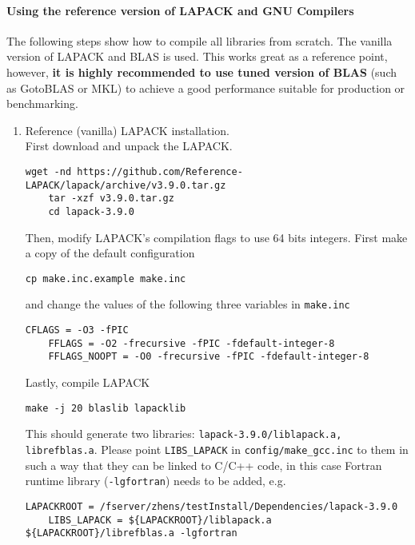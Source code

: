 \documentclass[english,11pt]{article}
\begin{document}
\paragraph{Using the reference version of LAPACK and GNU Compilers}
The following steps show how to compile all libraries from scratch. The vanilla version of LAPACK and BLAS is used. This works great as a reference point, however, {\bf it is  highly recommended to use tuned version of BLAS} (such as GotoBLAS or MKL) to achieve a good performance suitable for production or benchmarking.
\begin{enumerate}
    \item Reference (vanilla) LAPACK installation.\\
    First download and unpack the LAPACK.
    \begin{lstlisting}[breaklines=true, showstringspaces=false]
    wget -nd https://github.com/Reference-LAPACK/lapack/archive/v3.9.0.tar.gz
    tar -xzf v3.9.0.tar.gz
    cd lapack-3.9.0
    \end{lstlisting}
    Then, modify LAPACK's compilation flags to use 64 bits integers. First make a copy of the default configuration
    \begin{lstlisting}[breaklines=true, showstringspaces=false]
    cp make.inc.example make.inc
    \end{lstlisting}
    and change the values of the following three variables in {\tt make.inc}
    \begin{lstlisting}[breaklines=true, showstringspaces=false]
    CFLAGS = -O3 -fPIC
    FFLAGS = -O2 -frecursive -fPIC -fdefault-integer-8
    FFLAGS_NOOPT = -O0 -frecursive -fPIC -fdefault-integer-8
    \end{lstlisting}
    Lastly, compile LAPACK
    \begin{lstlisting}[breaklines=true, showstringspaces=false]
    make -j 20 blaslib lapacklib 
    \end{lstlisting}
    This should generate two libraries: {\tt lapack-3.9.0/liblapack.a, librefblas.a}. Please point {\tt LIBS_LAPACK} in {\tt config/make_gcc.inc} to them in such a way that they can be linked to C/C++ code, in this case Fortran runtime library ({\tt -lgfortran}) needs to be added, e.g.
    \begin{lstlisting}[breaklines=true, showstringspaces=false]
    LAPACKROOT = /fserver/zhens/testInstall/Dependencies/lapack-3.9.0
    LIBS_LAPACK = ${LAPACKROOT}/liblapack.a ${LAPACKROOT}/librefblas.a -lgfortran
    \end{lstlisting}
    

\end{enumerate}
\end{document}
